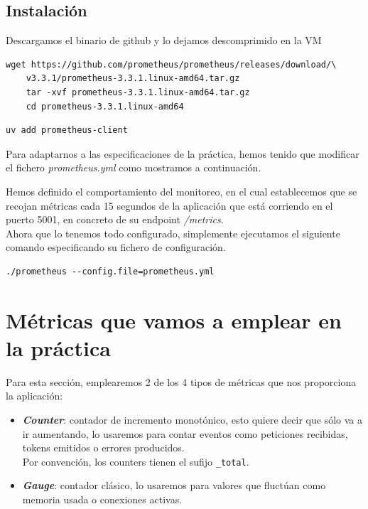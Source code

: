 \documentclass[12pt, a4paper]{article}
\begin{document}
	\subsection{Instalación}
	
	Descargamos el binario de github y lo dejamos descomprimido en la VM
\begin{lstlisting}[style=bash]
	wget https://github.com/prometheus/prometheus/releases/download/\
	v3.3.1/prometheus-3.3.1.linux-amd64.tar.gz
	tar -xvf prometheus-3.3.1.linux-amd64.tar.gz
	cd prometheus-3.3.1.linux-amd64
\end{lstlisting}
\begin{lstlisting}[style=bash]
	uv add prometheus-client
\end{lstlisting}
	Para adaptarnos a las especificaciones de la práctica, hemos tenido que modificar el fichero \textit{prometheus.yml} como mostramos a continuación.
	\vspace{1cm}
	
	\vspace{1cm}
	Hemos definido el comportamiento del monitoreo, en el cual establecemos que se recojan métricas cada 15 segundos de la aplicación que está corriendo en el puerto 5001, en concreto de su endpoint \textit{/metrics}.\\
	Ahora que lo tenemos todo configurado, simplemente ejecutamos el siguiente comando especificando su fichero de configuración.
	\begin{lstlisting}[style=bash]
		./prometheus --config.file=prometheus.yml
	\end{lstlisting}
	
\newpage
\section{Métricas que vamos a emplear en la práctica}
	Para esta sección, emplearemos 2 de los 4 tipos de métricas que nos proporciona la aplicación:
	\begin{itemize}
		\item \textbf{\textit{Counter}}: contador de incremento monotónico, esto quiere decir que sólo va a ir aumentando, lo  usaremos para contar eventos como peticiones recibidas, tokens emitidos o errores producidos.\\Por convención, los counters tienen el sufijo \texttt{\_total}.
		\item \textbf{\textit{Gauge}}: contador clásico,  lo usaremos para valores que fluctúan como memoria usada o conexiones activas.
	\end{itemize}
	
\end{document}
